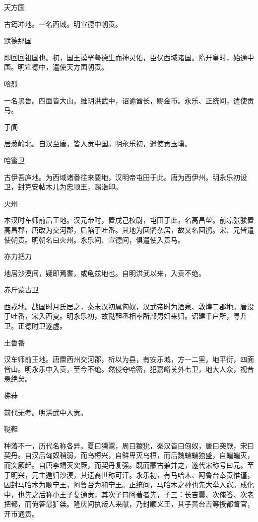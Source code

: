 \documentclass[a4paper,12pt,UTF8,twoside]{ctexbook}
\begin{document}
    天方国
    
    古筠冲地。一名西域。明宣德中朝贡。
    
    默德那国
    
    即回回祖国也。初，国王谟罕蓦德生而神灵佑，臣伏西域诸国。隋开皇时，始通中国。明宣德中，遣使天方国朝贡。
    
    哈烈
    
    一名黑鲁。四面皆大山。维明洪武中，诏谕酋长，赐金币。永乐、正统间，遣使贡马。
    
    于阗
    
    居葱岭北。自汉至唐，皆入贡中国。明永乐初，遣使贡玉璞。
    
    哈蜜卫
    
    古伊吾庐地。为西域诸番往来要地，汉明帝屯田于此。唐为西伊州。明永乐初设卫，封克安帖木儿为忠顺王，赐诰印。
    
    火州
    
    本汉时车师前后王地。汉元帝时，置戊己校尉，屯田于此，名高昌垒。前凉张骏置高昌郡，唐改为交河郡，后陷于吐番。其地为回鹘杂居，故又名回鹘。宋、元皆遣使朝贡。明朝名曰火州。永乐间、宣德间，俱遣使入贡马。
    
    亦力把力
    
    地居沙漠间，疑即焉耆，或龟兹地也。自明洪武以来，入贡不绝。
    
    赤斤蒙古卫
    
    西戎地。战国时月氏居之，秦末汉初属匈奴，汉武帝时为酒泉、敦煌二郡地。唐没于吐番，宋入西夏。明永乐初，故鞑靼丞相率所部男妇来归。诏建千户所，寻升卫。正德时卫遂虚。
    
    土鲁番
    
    汉车师前王地。唐置西州交河郡，析以为县，有安乐城，方一二里，地平衍，四面皆山。明永乐中入贡，至今不绝。然侵夺哈密，犯嘉峪关外七卫，地大人众，视昔悬绝矣。
    
    拂菻
    
    前代无考。明洪武中入贡。
    
    鞑靼
    
    种落不一，历代名称各异。夏曰獯鬻，周曰玁狁，秦汉皆曰匈奴，唐曰突厥，宋曰契丹。自汉后匈奴稍弱，而乌桓兴，自鲜卑灭乌桓，而后魏蠕蠕独盛，自蠕蠕灭，而突厥起。自唐李靖灭突厥，而契丹复强。既而蒙古兼并之，遂代宋称号曰元。至于明兴，元主遁归沙漠，其遗裔世称可汗。永乐初，有马哈木、阿鲁台奉贡惟谨，因封马哈木为顺宁王，阿鲁台为和宁王。正统间，马哈木之孙也先大举入寇。成化中，也先之后称小王子复通贡，其次子曰阿著者先，子三：长吉囊、次俺答、次老把都，而俺答最犷桀。隆庆间执叛人来献，乃封顺义王，其子黄台吉等授都督官，开市通贡。
    
\end{document}

